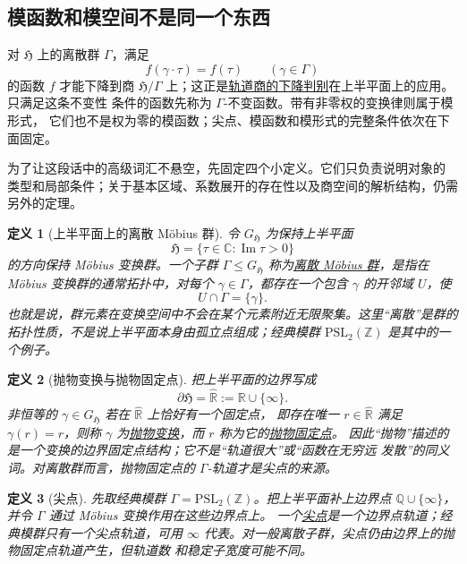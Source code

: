 \documentclass[UTF8,fontset=none,a4paper,11pt]{ctexart}
\theoremstyle{foundation-definition}
\newtheorem{definition}{定义}[section]
\theoremstyle{foundation-theorem}
\theoremstyle{foundation-proposition}
\theoremstyle{foundation-example}
\theoremstyle{foundation-remark}
\theoremstyle{foundation-theorem}
\newcommand{\term}[2]{\hyperref[#1]{#2}}
\begin{document}
\subsection{模函数和模空间不是同一个东西}

对 \(\mathfrak H\) 上的离散群 \(\Gamma\)，满足
\[
f(\gamma\cdot\tau)=f(\tau)
\qquad(\gamma\in\Gamma)
\]
的函数 \(f\) 才能下降到商 \(\mathfrak H/\Gamma\) 上；这正是\term{prop:orbit-quotient-descent}{轨道商的下降判别}在上半平面上的应用。只满足这条不变性
条件的函数先称为 \(\Gamma\)-不变函数。带有非零权的变换律则属于模形式，
它们也不是权为零的模函数；尖点、模函数和模形式的完整条件依次在下面固定。

为了让这段话中的高级词汇不悬空，先固定四个小定义。它们只负责说明对象的
类型和局部条件；关于基本区域、系数展开的存在性以及商空间的解析结构，仍需
另外的定理。

\begin{definition}[上半平面上的离散 Möbius 群]\label{def:discrete-mobius-group}
令 \(G_{\mathfrak H}\) 为保持上半平面
\[
\mathfrak H=\{\tau\in\mathbb C:\operatorname{Im}\tau>0\}
\]
的方向保持 Möbius 变换群。一个子群 \(\Gamma\leq G_{\mathfrak H}\) 称为\term{def:discrete-mobius-group}{离散 Möbius 群}，是指在 Möbius 变换群的通常拓扑中，对每个
\(\gamma\in\Gamma\)，都存在一个包含 \(\gamma\) 的开邻域 \(U\)，使
\[
U\cap\Gamma=\{\gamma\}.
\]
也就是说，群元素在变换空间中不会在某个元素附近无限聚集。这里“离散”是群的
拓扑性质，不是说上半平面本身由孤立点组成；经典模群
\(\mathrm{PSL}_2(\mathbb Z)\) 是其中的一个例子。
\end{definition}

\begin{definition}[抛物变换与抛物固定点]\label{def:parabolic-fixed-point}
把上半平面的边界写成
\[
\partial\mathfrak H=\widehat{\mathbb R}:=\mathbb R\cup\{\infty\}.
\]
非恒等的 \(\gamma\in G_{\mathfrak H}\) 若在 \(\widehat{\mathbb R}\) 上恰好有一个固定点，
即存在唯一 \(r\in\widehat{\mathbb R}\) 满足 \(\gamma(r)=r\)，则称 \(\gamma\) 为\term{def:parabolic-fixed-point}{抛物变换}，而 \(r\) 称为它的\term{def:parabolic-fixed-point}{抛物固定点}。
因此“抛物”描述的是一个变换的边界固定点结构；它不是“轨道很大”或“函数在无穷远
发散”的同义词。对离散群而言，抛物固定点的 \(\Gamma\)-轨道才是尖点的来源。
\end{definition}

\begin{definition}[尖点]\label{def:cusp}
先取经典模群 \(\Gamma=\mathrm{PSL}_2(\mathbb Z)\)。把上半平面补上边界点
\(\mathbb Q\cup\{\infty\}\)，并令 \(\Gamma\) 通过 Möbius 变换作用在这些边界点上。
一个\term{def:cusp}{尖点}是一个边界点轨道；经典模群只有一个尖点轨道，可用
\(\infty\) 代表。对一般离散子群，尖点仍由边界上的抛物固定点轨道产生，但轨道数
和稳定子宽度可能不同。
\end{definition}
\end{document}
